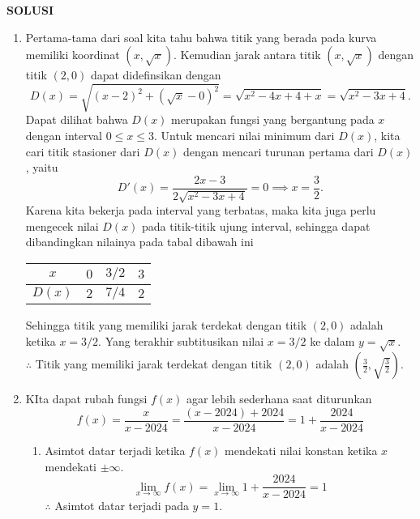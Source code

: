 \documentclass[10pt,openany,a4paper]{article}
\renewcommand{\headrulewidth}{0pt}
\begin{document}
\newpage
{}
{\centering\textbf{SOLUSI}}
\renewcommand{\arraystretch}{1.5}
\renewcommand{\headrulewidth}{1pt}
\begin{enumerate}
    \item Pertama-tama dari soal kita tahu bahwa titik yang berada pada kurva memiliki koordinat $(x, \sqrt{x})$. Kemudian jarak antara titik $(x, \sqrt{x})$ dengan titik $(2, 0)$ dapat didefinsikan dengan
          \[D(x)= \sqrt{(x-2)^2 + (\sqrt{x} - 0)^2} = \sqrt{x^2 - 4x + 4 + x} = \sqrt{x^2 - 3x + 4}.\]
          Dapat dilihat bahwa $D(x)$ merupakan fungsi yang bergantung pada $x$ dengan interval $0 \leq x \leq 3$. Untuk mencari nilai minimum dari $D(x)$, kita cari titik stasioner dari $D(x)$ dengan mencari turunan pertama dari $D(x)$, yaitu
          \[D'(x) = \frac{2x - 3}{2\sqrt{x^2 - 3x + 4}} = 0 \implies x = \frac{3}{2}.\]
          Karena kita bekerja pada interval yang terbatas, maka kita juga perlu mengecek nilai $D(x)$ pada titik-titik ujung interval, sehingga dapat dibandingkan nilainya pada tabal dibawah ini
          \begin{center}
              \begin{tabular}{|c|c|c|c|}
                  \hline
                  $x$    & $0$ & $3/2$ & $3$ \\ \hline
                  $D(x)$ & $2$ & $7/4$ & $2$ \\ \hline
              \end{tabular}
          \end{center}
          Sehingga titik yang memiliki jarak terdekat dengan titik $(2, 0)$ adalah ketika $x = 3/2$. Yang terakhir subtitusikan nilai $x = 3/2$ ke dalam $y = \sqrt{x}$.\\

          $\therefore$ Titik yang memiliki jarak terdekat dengan titik $(2, 0)$ adalah $\left(\displaystyle\frac{3}{2}, \sqrt{\frac{3}{2}}\right)$.

    \item KIta dapat rubah fungsi $f(x)$ agar lebih sederhana saat diturunkan
          \[f(x) = \frac{x}{x - 2024} = \frac{(x-2024)+2024}{x-2024}=1+\frac{2024}{x-2024}\]
          \begin{enumerate}
              \item Asimtot datar terjadi ketika $f(x)$ mendekati nilai konstan ketika $x$ mendekati $\pm \infty$.
                    \[\lim_{x \to \infty} f(x) = \lim_{x \to \infty} 1+\frac{2024}{x-2024} = 1\]
                    $\therefore$ Asimtot datar terjadi pada $y = 1$. \\~\\


\end{enumerate}
\end{enumerate}
\end{document}
